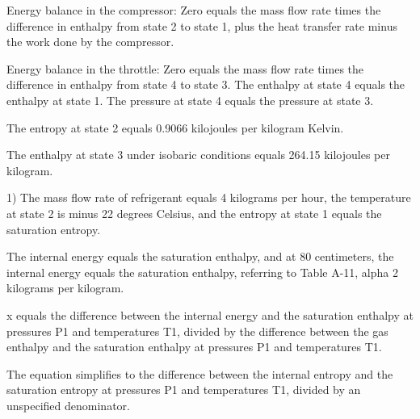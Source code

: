 Energy balance in the compressor:
Zero equals the mass flow rate times the difference in enthalpy from state 2 to state 1, plus the heat transfer rate minus the work done by the compressor.

Energy balance in the throttle:
Zero equals the mass flow rate times the difference in enthalpy from state 4 to state 3.
The enthalpy at state 4 equals the enthalpy at state 1.
The pressure at state 4 equals the pressure at state 3.

The entropy at state 2 equals 0.9066 kilojoules per kilogram Kelvin.

The enthalpy at state 3 under isobaric conditions equals 264.15 kilojoules per kilogram.

1) The mass flow rate of refrigerant equals 4 kilograms per hour, the temperature at state 2 is minus 22 degrees Celsius, and the entropy at state 1 equals the saturation entropy.

The internal energy equals the saturation enthalpy, and at 80 centimeters, the internal energy equals the saturation enthalpy, referring to Table A-11, alpha 2 kilograms per kilogram.

x equals the difference between the internal energy and the saturation enthalpy at pressures P1 and temperatures T1, divided by the difference between the gas enthalpy and the saturation enthalpy at pressures P1 and temperatures T1.

The equation simplifies to the difference between the internal entropy and the saturation entropy at pressures P1 and temperatures T1, divided by an unspecified denominator.